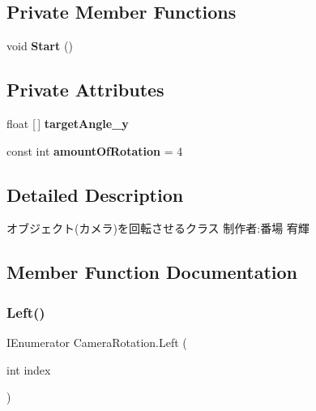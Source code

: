 \subsection*{Private Member Functions}
\begin{DoxyCompactItemize}
\item 
\mbox{\label{class_camera_rotation_a281bc952c75cba56649132536fef9108}} 
void {\bfseries Start} ()
\end{DoxyCompactItemize}
\subsection*{Private Attributes}
\begin{DoxyCompactItemize}
\item 
\mbox{\label{class_camera_rotation_af1c40b088f9541a9bd1e6dd45eb7194a}} 
float \mbox{[}$\,$\mbox{]} {\bfseries target\+Angle\+\_\+y}
\item 
\mbox{\label{class_camera_rotation_a3bf88ff4a5f5f327ffc918960ceeaa93}} 
const int {\bfseries amount\+Of\+Rotation} = 4
\end{DoxyCompactItemize}


\subsection{Detailed Description}
オブジェクト(カメラ)を回転させるクラス 制作者\+:番場 宥輝 



\subsection{Member Function Documentation}
\mbox{\label{class_camera_rotation_a784513a00a2d8ed9ee568b0b94b7b273}} 
\subsubsection{\texorpdfstring{Left()}{Left()}}
{\footnotesize\ttfamily I\+Enumerator Camera\+Rotation.\+Left (\begin{DoxyParamCaption}\item[{int}]{index }\end{DoxyParamCaption})\hspace{0.3cm}{\ttfamily [inline]}}



